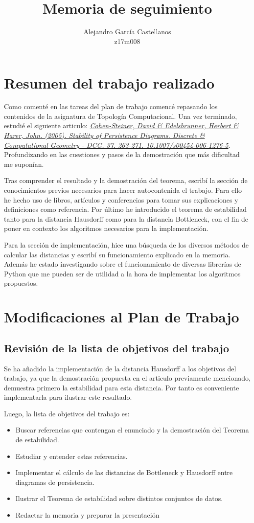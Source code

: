 \documentclass[a4paper, 12pt]{article}
\title{Memoria de seguimiento}
\author{Alejandro García Castellanos\\z17m008}
\begin{document}
\maketitle 

\section{Resumen del trabajo realizado}
Como comenté en las tareas del plan de trabajo comencé repasando los contenidos de la asignatura de Topología Computacional. Una vez terminado, estudié el siguiente articulo: \textit{\href{https://link.springer.com/content/pdf/10.1007/s00454-006-1276-5.pdf}{Cohen-Steiner, David \& Edelsbrunner, Herbert \& Harer, John. (2005). Stability of Persistence Diagrams. Discrete \& Computational Geometry - DCG. 37. 263-271. 10.1007/s00454-006-1276-5}}. Profundizando en las cuestiones y pasos de la demostración que más dificultad me suponían.

Tras comprender el resultado y la demostración del teorema, escribí la sección de conocimientos previos necesarios para hacer autocontenida el trabajo. Para ello he hecho uso de libros, artículos y conferencias para tomar sus explicaciones y definiciones como referencia. Por último he introducido el teorema de estabilidad tanto para la distancia Hausdorff como para la distancia Bottleneck, con el fin de poner en contexto los algoritmos necesarios para la implementación.

Para la sección de implementación, hice una búsqueda de los diversos métodos de calcular las distancias y escribí su funcionamiento explicado en la memoria. Además he estado investigando sobre el funcionamiento de diversas librerías de Python que me pueden ser de utilidad a la hora de implementar los algoritmos propuestos.
\section{Modificaciones al Plan de Trabajo}
\subsection{Revisión de la lista de objetivos del trabajo}
Se ha añadido la implementación de la distancia Hausdorff a los objetivos del trabajo, ya que la demostración propuesta en el articulo previamente mencionado, demuestra primero la estabilidad para esta distancia. Por tanto es conveniente implementarla para ilustrar este resultado.

Luego, la lista de objetivos del trabajo es:
\begin{itemize}
	\item Buscar referencias que contengan el enunciado y la demostración del Teorema de estabilidad.
	\item Estudiar y entender estas referencias.
	\item Implementar el cálculo de las distancias de Bottleneck y Hausdorff entre diagramas de persistencia.
	\item Ilustrar el Teorema de estabilidad sobre distintos conjuntos de datos.
	\item Redactar la memoria y preparar la presentación
\end{itemize}
\end{document}

